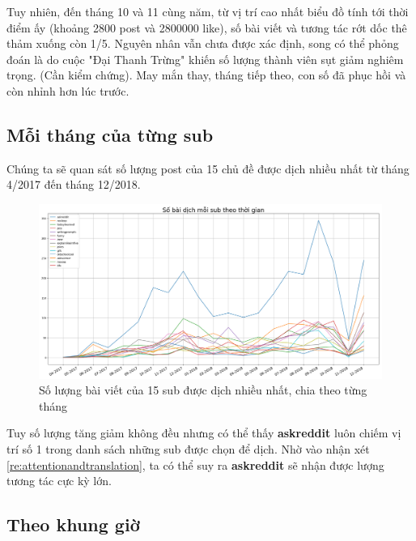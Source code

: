 \documentclass[10pt,a4paper]{article}
\begin{document}
Tuy nhiên, đến tháng 10 và 11 cùng năm, từ vị trí cao nhất biểu đồ tính tới thời điểm ấy (khoảng 2800 post và 2800000 like), số bài viết và tương tác rớt dốc thê thảm xuống còn 1/5. Nguyên nhân vẫn chưa được xác định, song có thể phỏng đoán là do cuộc "Đại Thanh Trừng" khiến số lượng thành viên sụt giảm nghiêm trọng. (Cần kiểm chứng). May mắn thay, tháng tiếp theo, con số đã phục hồi và còn nhỉnh hơn lúc trước.

\subsection{Mỗi tháng của từng sub}
Chúng ta sẽ quan sát số lượng post của 15 chủ đề được dịch nhiều nhất từ tháng 4/2017 đến tháng 12/2018.

\begin{figure}[h]
    \centering
    \includegraphics[width=\textwidth]{img/PostsOverTime.png}
    \caption{Số lượng bài viết của 15 sub được dịch nhiều nhất, chia theo từng tháng}
    \label{fig:postsovertime}
\end{figure}

Tuy số lượng tăng giảm không đều nhưng có thể thấy \textbf{askreddit} luôn chiếm vị trí số 1 trong danh sách những sub được chọn để dịch. Nhờ vào nhận xét \eqref{re:attentionandtranslation}, ta có thể suy ra \textbf{askreddit} sẽ nhận được lượng tương tác cực kỳ lớn.

\subsection{Theo khung giờ}
\end{document}
